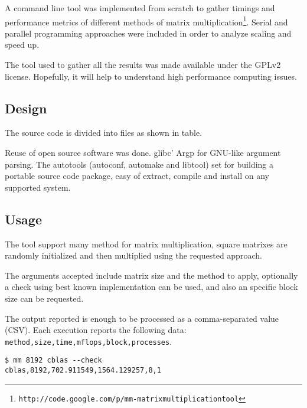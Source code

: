 \documentclass[a4paper,twocolumn]{article}
\begin{document}
A command line tool was implemented from scratch to gather timings and 
performance metrics of different methods of matrix multiplication\footnote{\tt http://code.google.com/p/mm-matrixmultiplicationtool}. Serial and parallel programming approaches were included in order to analyze scaling and speed up.

\smallskip

The tool used to gather all the results was made available under the GPLv2
license. Hopefully, it will help to understand high performance computing 
issues.

\smallskip

\subsection{Design}

The source code is divided into files as shown in table.

\smallskip

Reuse of open source software was done. glibc' Argp for GNU-like argument 
parsing. The autotools (autoconf, automake and libtool) set for building a 
portable source code package, easy of extract, compile and install on any 
supported system. 

\subsection{Usage}

The tool support many method for matrix multiplication, square matrixes are
randomly initialized and then multiplied using the requested approach.

\smallskip

The arguments accepted include matrix size and the method to apply, optionally
a check using best known implementation can be used, and also an specific block
size can be requested.

\smallskip

The output reported is enough to be processed as a comma-separated value (CSV).
Each execution reports the following data: {\tt method,size,time,mflops,block,processes}.

\begin{verbatim}
$ mm 8192 cblas --check
cblas,8192,702.911549,1564.129257,8,1
\end{verbatim}



\end{document}
